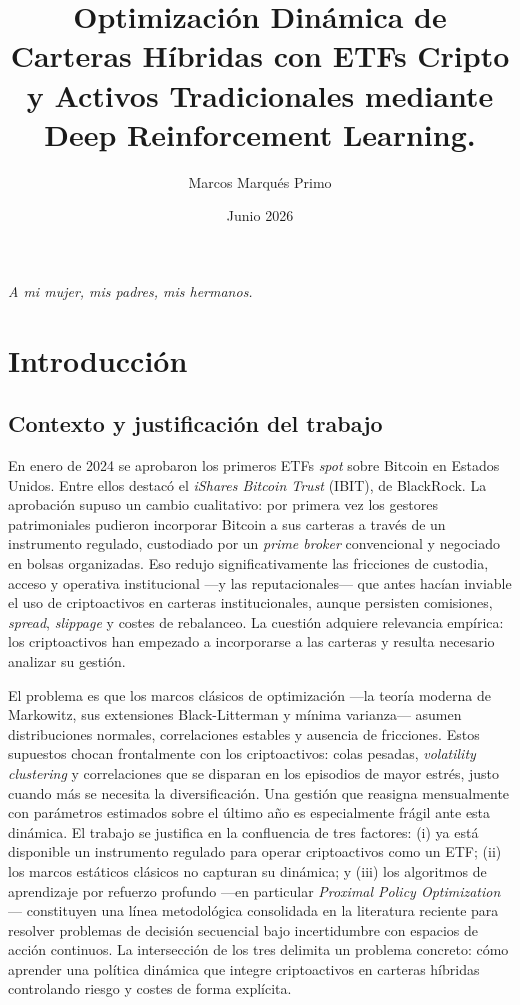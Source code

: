 \documentclass[IB,a4paper]{TFUOC}
\title{Optimización Dinámica de Carteras Híbridas con ETFs Cripto y Activos Tradicionales mediante Deep Reinforcement Learning.}
\author{Marcos Marqués Primo}
\date{Junio 2026}
\begin{document}
\estructura

\cleardoublepage
\thispagestyle{empty}
\vspace*{\fill}
\begin{flushright}
\textit{A mi mujer, mis padres, mis hermanos.}
\end{flushright}
\vspace*{\fill}
\clearpage

\tableofcontents

\listoffigures

\listoftables

\cleardoublepage
{}
\setcounter{page}{1}

\chapter{Introducción}

\section{Contexto y justificación del trabajo}

En enero de 2024 se aprobaron los primeros ETFs \textit{spot} sobre Bitcoin en Estados Unidos. Entre ellos destacó el \textit{iShares Bitcoin Trust} (IBIT), de BlackRock. La aprobación supuso un cambio cualitativo: por primera vez los gestores patrimoniales pudieron incorporar Bitcoin a sus carteras a través de un instrumento regulado, custodiado por un \textit{prime broker} convencional y negociado en bolsas organizadas. Eso redujo significativamente las fricciones de custodia, acceso y operativa institucional ---y las reputacionales--- que antes hacían inviable el uso de criptoactivos en carteras institucionales, aunque persisten comisiones, \textit{spread}, \textit{slippage} y costes de rebalanceo. La cuestión adquiere relevancia empírica: los criptoactivos han empezado a incorporarse a las carteras y resulta necesario analizar su gestión.

El problema es que los marcos clásicos de optimización —la teoría moderna de Markowitz, sus extensiones Black-Litterman y mínima varianza— asumen distribuciones normales, correlaciones estables y ausencia de fricciones. Estos supuestos chocan frontalmente con los criptoactivos: colas pesadas, \textit{volatility clustering} y correlaciones que se disparan en los episodios de mayor estrés, justo cuando más se necesita la diversificación. Una gestión que reasigna mensualmente con parámetros estimados sobre el último año es especialmente frágil ante esta dinámica. El trabajo se justifica en la confluencia de tres factores: (i) ya está disponible un instrumento regulado para operar criptoactivos como un ETF; (ii) los marcos estáticos clásicos no capturan su dinámica; y (iii) los algoritmos de aprendizaje por refuerzo profundo —en particular \textit{Proximal Policy Optimization}— constituyen una línea metodológica consolidada en la literatura reciente para resolver problemas de decisión secuencial bajo incertidumbre con espacios de acción continuos. La intersección de los tres delimita un problema concreto: cómo aprender una política dinámica que integre criptoactivos en carteras híbridas controlando riesgo y costes de forma explícita.
\end{document}

